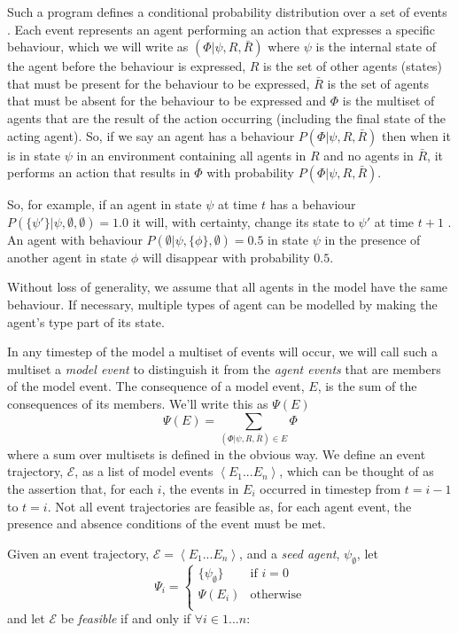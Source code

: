 \documentclass[sigconf]{aamas}
\begin{document}
Such a program defines a conditional probability distribution over a set of events \cite{staton2016semantics}. Each event represents an agent performing an action that expresses a specific behaviour, which we will write as $(\Phi|\psi,R,\bar{R})$ where $\psi$ is the internal state of the agent before the behaviour is expressed, $R$ is the set of other agents (states) that must be present for the behaviour to be expressed, $\bar{R}$ is the set of agents that must be absent for the behaviour to be expressed and $\Phi$ is the multiset of agents that are the result of the action occurring (including the final state of the acting agent). So, if we say an agent has a behaviour $P(\Phi|\psi,R,\bar{R})$ then when it is in state $\psi$ in an environment containing all agents in $R$ and no agents in $\bar{R}$, it performs an action that results in $\Phi$ with probability $P(\Phi|\psi,R,\bar{R})$.

So, for example, if an agent in state $\psi$ at time $t$ has a behaviour $P(\{\psi'\}|\psi,\emptyset,\emptyset) = 1.0$ it will, with certainty, change its state to $\psi'$ at time $t+1$ . An agent with behaviour $P(\emptyset|\psi,\{\phi\},\emptyset) = 0.5$ in state $\psi$ in the presence of another agent in state $\phi$ will disappear with probability $0.5$.

Without loss of generality, we assume that all agents in the model have the same behaviour. If necessary, multiple types of agent can be modelled by making the agent's type part of its state.

In any timestep of the model a multiset of events will occur, we will call such a multiset a \textit{model event} to distinguish it from the \textit{agent events} that are members of the model event. The consequence of a model event, $E$, is the sum of the consequences of its members. We'll write this as $\Psi(E)$
\begin{equation}
\Psi(E) = \sum_{(\Phi|\psi,R,\bar{R})\in E}\Phi
\label{psie}
\end{equation}
where a sum over multisets is defined in the obvious way. We define an event trajectory, $\mathcal{E}$, as a list of model events $\left<E_1...E_n\right>$, which can be thought of as the assertion that, for each $i$, the events in $E_i$ occurred in timestep from $t=i-1$ to $t=i$. Not all event trajectories are feasible as, for each agent event, the presence and absence conditions of the event must be met.

Given an event trajectory, $\mathcal{E} = \left<E_1...E_n\right>$, and a \textit{seed agent},  $\psi_\emptyset$, let
\[
\Psi_i =
\begin{cases}
 \{\psi_\emptyset\} & \text{if }i=0\\
 \Psi(E_i) & \text{otherwise}\\
\end{cases}
\]
and let $\mathcal{E}$ be \textit{feasible} if and only if $\forall i\in 1...n:$
\end{document}
